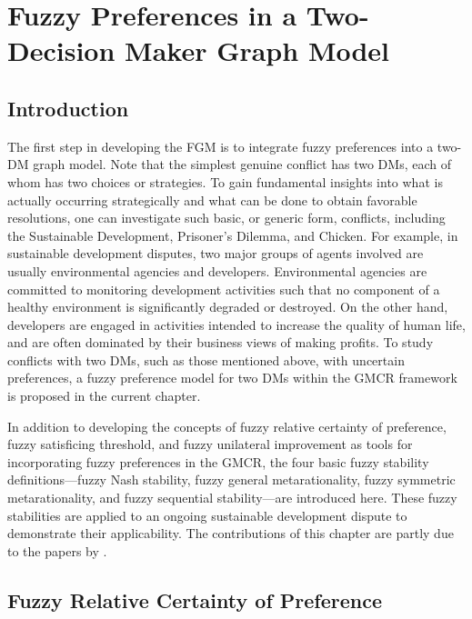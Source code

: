\chapter{Fuzzy Preferences in a Two-Decision Maker Graph Model}\label{chap-fuz-pref-2dm}

\section{Introduction}

The first step in developing the FGM is to integrate fuzzy preferences into a two-DM graph model. Note that the simplest genuine conflict has two DMs, each of whom has two choices or strategies. To gain fundamental insights into what is actually occurring strategically and what can be done to obtain favorable resolutions, one can investigate such basic, or generic form, conflicts, including the Sustainable Development, Prisoner's Dilemma, and Chicken. For example, in sustainable development disputes, two major groups of agents involved are usually environmental agencies and developers. Environmental agencies are committed to monitoring development activities such that no component of a healthy environment is significantly degraded or destroyed. On the other hand, developers are engaged in activities intended to increase the quality of human life, and are often dominated by their business views of making profits. To study conflicts with two DMs, such as those mentioned above, with uncertain preferences, a fuzzy preference model for two DMs within the GMCR framework is proposed in the current chapter.

In addition to developing the concepts of fuzzy relative certainty of preference, fuzzy satisficing threshold, and fuzzy unilateral improvement as tools for incorporating fuzzy preferences in the GMCR, the four basic fuzzy stability definitions---fuzzy Nash stability, fuzzy general metarationality, fuzzy symmetric metarationality, and fuzzy sequential stability---are introduced here. These fuzzy stabilities are applied to an ongoing sustainable development dispute to demonstrate their applicability. The contributions of this chapter are partly due to the papers by \citet{Bashar-et-al2009a, Bashar-et-al2009b, Bashar-et-al2010a, Bashar-et-al2011}.

\section{Fuzzy Relative Certainty of Preference}\label{sec-frsp}

